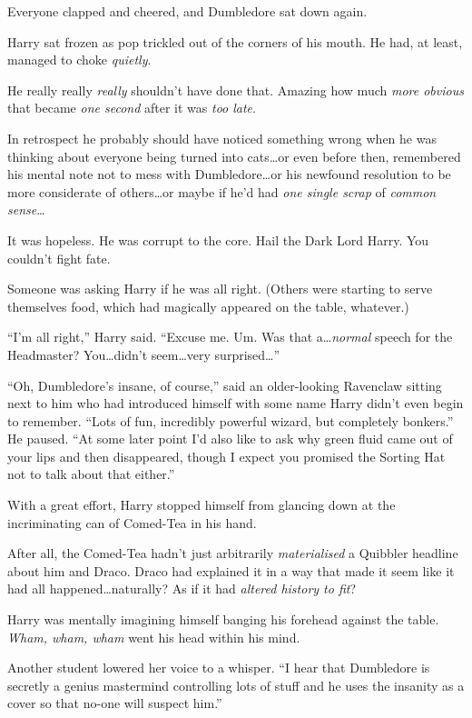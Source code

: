 Everyone clapped and cheered, and Dumbledore sat down again.

Harry sat frozen as pop trickled out of the corners of his mouth. He had, at least, managed to choke \emph{quietly}.

He really really \emph{really} shouldn’t have done that. Amazing how much \emph{more obvious} that became \emph{one second} after it was \emph{too late}.

In retrospect he probably should have noticed something wrong when he was thinking about everyone being turned into cats…or even before then, remembered his mental note not to mess with Dumbledore…or his newfound resolution to be more considerate of others…or maybe if he’d had \emph{one single scrap} of \emph{common sense}…

It was hopeless. He was corrupt to the core. Hail the Dark Lord Harry. You couldn’t fight fate.

Someone was asking Harry if he was all right. (Others were starting to serve themselves food, which had magically appeared on the table, whatever.)

“I’m all right,” Harry said. “Excuse me. Um. Was that a…\emph{normal} speech for the Headmaster? You…didn’t seem…very surprised…”

“Oh, Dumbledore’s insane, of course,” said an older-looking Ravenclaw sitting next to him who had introduced himself with some name Harry didn’t even begin to remember. “Lots of fun, incredibly powerful wizard, but completely bonkers.” He paused. “At some later point I’d also like to ask why green fluid came out of your lips and then disappeared, though I expect you promised the Sorting Hat not to talk about that either.”

With a great effort, Harry stopped himself from glancing down at the incriminating can of Comed-Tea in his hand.

After all, the Comed-Tea hadn’t just arbitrarily \emph{materialised} a Quibbler headline about him and Draco. Draco had explained it in a way that made it seem like it had all happened…naturally? As if it had \emph{altered history to fit}?

Harry was mentally imagining himself banging his forehead against the table. \emph{Wham, wham, wham} went his head within his mind.

Another student lowered her voice to a whisper. “I hear that Dumbledore is secretly a genius mastermind controlling lots of stuff and he uses the insanity as a cover so that no-one will suspect him.”

